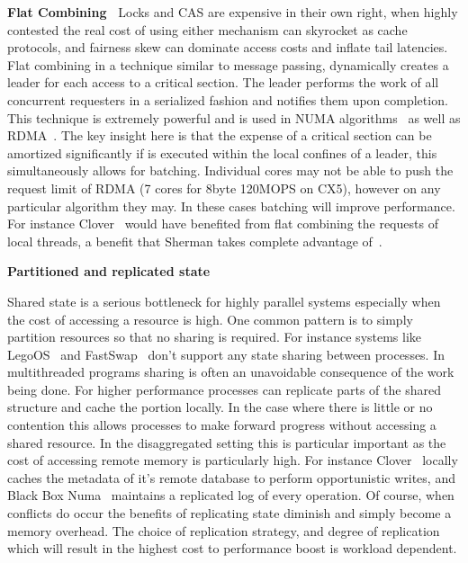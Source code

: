 \textbf{Flat Combining~\cite{flat-combine}} Locks and CAS are expensive in their
own right, when highly contested the real cost of using either mechanism can
skyrocket as cache protocols, and fairness skew can dominate access costs and
inflate tail latencies. Flat combining in a technique similar to message
passing, dynamically creates a leader for each access to a critical section. The
leader performs the work of all concurrent requesters in a serialized fashion
and notifies them upon completion. This technique is extremely powerful and is
used in NUMA algorithms~\cite{black-box-numa} as well as RDMA~\cite{flock}. The
key insight here is that the expense of a critical section can be amortized
significantly if is executed within the local confines of a leader, this
simultaneously allows for batching. Individual cores may not be able to push the
request limit of RDMA (7 cores for 8byte 120MOPS on CX5), however on
any particular algorithm they may. In these cases batching will improve
performance. For instance Clover~\cite{clover} would have benefited from flat
combining the requests of local threads, a benefit that Sherman takes complete
advantage of~\cite{sherman}.


\textbf{Partitioned and replicated state}

Shared state is a serious bottleneck for highly parallel systems especially when
the cost of accessing a resource is high. One common pattern is to simply
partition resources so that no sharing is required. For instance systems like
LegoOS~\cite{legoos} and FastSwap~\cite{fastswap} don't support any state
sharing between processes. In multithreaded programs sharing is often an
unavoidable consequence of the work being done. For higher performance processes
can replicate parts of the shared structure and cache the portion locally. In
the case where there is little or no contention this allows processes to make
forward progress without accessing a shared resource. In the disaggregated
setting this is particular important as the cost of accessing remote memory is
particularly high. For instance Clover~\cite{clover} locally caches the metadata
of it's remote database to perform opportunistic writes, and Black Box
Numa~\cite{black-box-numa} maintains a replicated log of every operation. Of
course, when conflicts do occur the benefits of replicating state diminish and
simply become a memory overhead. The choice of replication strategy, and degree
of replication which will result in the highest cost to performance boost is
workload dependent.


